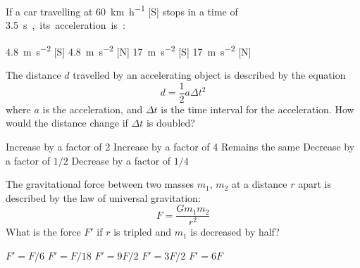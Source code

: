 \documentclass[12pt]{../ossphysics}
\begin{document}
\begin{questions}
  \question If a car travelling at \SI{60}{\kilo\metre\per\hour} [S] stops in
  a time of \SI{3.5}\second, its acceleration is:
  \begin{choices}
    \choice\SI{4.8}{\metre\per\second\squared} [S]
    \choice\SI{4.8}{\metre\per\second\squared} [N]
    \choice\SI{17}{\metre\per\second\squared} [S]
    \choice\SI{17}{\metre\per\second\squared} [N]
  \end{choices}
  


  \question The distance $d$ travelled by an accelerating object is described
  by the equation
  \begin{equation*}
    d=\dfrac12a\Delta t^2
    \end{equation*}
  where $a$ is the acceleration, and $\Delta t$ is the time interval for the
  acceleration. How would the distance change if $\Delta t$ is doubled?
  \begin{choices}
    \choice Increase by a factor of 2
    \choice Increase by a factor of 4
    \choice Remains the same
    \choice Decrease by a factor of $1/2$
    \choice Decrease by a factor of $1/4$
  \end{choices}
  
  \question The gravitational force between two masses $m_1$, $m_2$ at a
  distance $r$ apart is described by the law of universal gravitation:
  \begin{displaymath}
    F=\frac{Gm_1m_2}{r^2}
  \end{displaymath}
  What is the force $F'$ if $r$ is tripled and $m_1$ is decreased by half?
  \begin{choices}
    \choice $F'=F/6$
    \choice $F'=F/18$
    \choice $F'=9F/2$
    \choice $F'=3F/2$
    \choice $F'=6F$
  \end{choices}
  

\end{questions}
\end{document}

